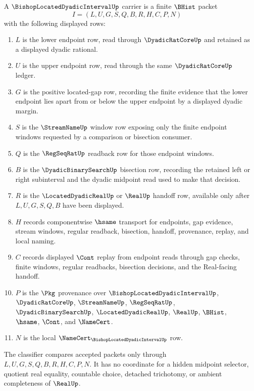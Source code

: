 \begin{definition}
\label{def:bishop-located-dyadic-interval-carrier}
A $\BishopLocatedDyadicIntervalUp$ carrier is a finite $\BHist$ packet
$$
I=(L,U,G,S,Q,B,R,H,C,P,N)
$$
with the following displayed rows:
\begin{enumerate}
\item $L$ is the lower endpoint row, read through $\DyadicRatCoreUp$ and retained as a displayed dyadic rational.
\item $U$ is the upper endpoint row, read through the same $\DyadicRatCoreUp$ ledger.
\item $G$ is the positive located-gap row, recording the finite evidence that the lower endpoint lies apart from or below the upper endpoint by a displayed dyadic margin.
\item $S$ is the $\StreamNameUp$ window row exposing only the finite endpoint windows requested by a comparison or bisection consumer.
\item $Q$ is the $\RegSeqRatUp$ readback row for those endpoint windows.
\item $B$ is the $\DyadicBinarySearchUp$ bisection row, recording the retained left or right subinterval and the dyadic midpoint read used to make that decision.
\item $R$ is the $\LocatedDyadicRealUp$ or $\RealUp$ handoff row, available only after $L,U,G,S,Q,B$ have been displayed.
\item $H$ records componentwise $\hsame$ transport for endpoints, gap evidence, stream windows, regular readback, bisection, handoff, provenance, replay, and local naming.
\item $C$ records displayed $\Cont$ replay from endpoint reads through gap checks, finite windows, regular readbacks, bisection decisions, and the Real-facing handoff.
\item $P$ is the $\Pkg$ provenance over $\BishopLocatedDyadicIntervalUp$, $\DyadicRatCoreUp$, $\StreamNameUp$, $\RegSeqRatUp$, $\DyadicBinarySearchUp$, $\LocatedDyadicRealUp$, $\RealUp$, $\BHist$, $\hsame$, $\Cont$, and $\NameCert$.
\item $N$ is the local $\NameCert_{\BishopLocatedDyadicIntervalUp}$ row.
\end{enumerate}
The classifier compares accepted packets only through $L,U,G,S,Q,B,R,H,C,P,N$. It has no coordinate for a hidden midpoint selector, quotient real equality, countable choice, detached trichotomy, or ambient completeness of $\RealUp$.
\end{definition}

